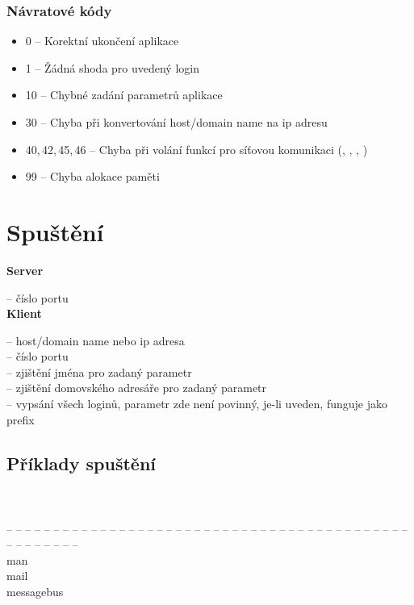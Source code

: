 \documentclass[11pt, a4paper, titlepage]{article}
\begin{document}
		\subsubsection{Návratové kódy}
		\begin{itemize}
			\item  0 -- Korektní ukončení aplikace
			\item  1 -- Žádná shoda pro uvedený login
			\item 10 -- Chybné zadání parametrů aplikace
			\item 30 -- Chyba při konvertování host/domain name na ip adresu
			\item 40,\,42,\,45,\,46 -- Chyba při volání funkcí pro síťovou komunikaci (, , , )
			\item 99 -- Chyba alokace paměti
		\end{itemize}


\section{Spuštění}

	\textbf{Server} \\
	\smallskip

	 -- číslo portu \\

	\textbf{Klient} \\
	\smallskip

	 -- host/domain name nebo ip adresa \\
	 -- číslo portu \\
	 -- zjištění jména pro zadaný parametr  \\
	 -- zjištění domovského adresáře pro zadaný parametr  \\
	 -- vypsání všech loginů, parametr  zde není povinný, je-li uveden, funguje jako prefix

	\subsection{Příklady spuštění}
		\begin{framed}
			 \\
			 \\
			-- -- -- -- -- -- -- -- -- -- -- -- -- -- -- -- -- -- -- -- -- -- -- -- -- --
			-- -- -- -- -- -- -- -- -- -- -- -- -- -- -- -- -- -- -- -- -- -- -- -- -- \\
			man \\
			mail \\
			messagebus
		\end{framed}
\end{document}
